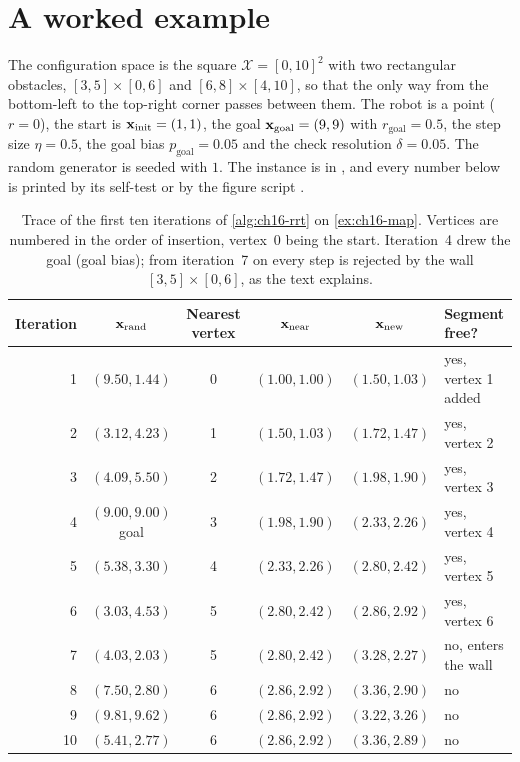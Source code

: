 \section{A worked example}
\label{sec:ch16-example}

\begin{example}
\label{ex:ch16-map}
The configuration space is the square $\mathcal{X}=[0,10]^{2}$ with two
rectangular obstacles, $[3,5]\times[0,6]$ and $[6,8]\times[4,10]$, so that
the only way from the bottom-left to the top-right corner passes between
them. The robot is a point ($r=0$), the start is
$\mathbf{x}_{\mathrm{init}}=(1,1)$, the goal $\mathbf{x}_{\mathrm{goal}}=(9,9)$ with
$r_{\mathrm{goal}}=0.5$, the step size $\eta=0.5$, the goal bias
$p_{\mathrm{goal}}=0.05$ and the check resolution $\delta=0.05$. The random
generator is seeded with $1$. The instance is 
in , and every number below is printed by its self-test or
by the figure script .
\end{example}

\begin{table}[tb]
\centering\small
\caption{Trace of the first ten iterations of \cref{alg:ch16-rrt} on
\cref{ex:ch16-map}. Vertices are numbered in the order of insertion, vertex~0
being the start. Iteration~4 drew the goal (goal bias); from iteration~7 on
every step is rejected by the wall $[3,5]\times[0,6]$, as the text explains.}
\label{tab:ch16-trace}
\begin{tabular}{@{}rccccl@{}}
\toprule
Iteration & $\mathbf{x}_{\mathrm{rand}}$ & Nearest vertex & $\mathbf{x}_{\mathrm{near}}$ & $\mathbf{x}_{\mathrm{new}}$ & Segment free? \\
\midrule
1  & $(9.50, 1.44)$ & 0 & $(1.00, 1.00)$ & $(1.50, 1.03)$ & yes, vertex 1 added\\
2  & $(3.12, 4.23)$ & 1 & $(1.50, 1.03)$ & $(1.72, 1.47)$ & yes, vertex 2\\
3  & $(4.09, 5.50)$ & 2 & $(1.72, 1.47)$ & $(1.98, 1.90)$ & yes, vertex 3\\
4  & $(9.00, 9.00)$ goal & 3 & $(1.98, 1.90)$ & $(2.33, 2.26)$ & yes, vertex 4\\
5  & $(5.38, 3.30)$ & 4 & $(2.33, 2.26)$ & $(2.80, 2.42)$ & yes, vertex 5\\
6  & $(3.03, 4.53)$ & 5 & $(2.80, 2.42)$ & $(2.86, 2.92)$ & yes, vertex 6\\
7  & $(4.03, 2.03)$ & 5 & $(2.80, 2.42)$ & $(3.28, 2.27)$ & no, enters the wall\\
8  & $(7.50, 2.80)$ & 6 & $(2.86, 2.92)$ & $(3.36, 2.90)$ & no\\
9  & $(9.81, 9.62)$ & 6 & $(2.86, 2.92)$ & $(3.22, 3.26)$ & no\\
10 & $(5.41, 2.77)$ & 6 & $(2.86, 2.92)$ & $(3.36, 2.89)$ & no\\
\bottomrule
\end{tabular}
\end{table}

